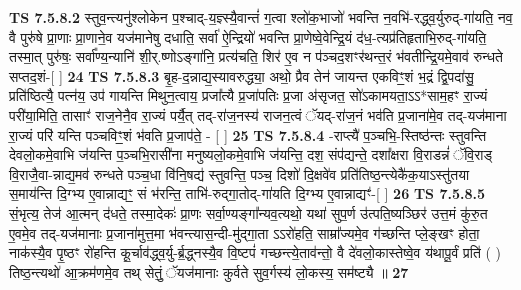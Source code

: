 \documentclass[17pt]{extarticle}
\begin{document}
                  \newline
                                \textbf{ TS 7.5.8.2} \newline
                  स्तुव॒न्त्यनु॑श्लोकेन प॒श्चाद्-य॒ज्ञ्स्यै॒वान्तं॑ ग॒त्वा श्लो॑क॒भाजो॑ भवन्ति न॒वभि॑-रद्ध्व॒र्युरुद्-गा॑यति॒ नव॒ वै पुरु॑षे प्रा॒णाः प्रा॒णाने॒व यज॑मानेषु दधाति॒ सर्वा॑ ऐ॒न्द्रियो॑ भवन्ति प्रा॒णेष्वे॒वेन्द्रि॒यं द॑ध॒-त्यप्र॑तिहृताभि॒रुद्-गा॑यति॒ तस्मा॒त् पुरु॑षः॒ सर्वा᳚ण्य॒न्यानि॑ शी॒र्.ष्णोऽङ्गा॑नि॒ प्रत्य॑चति॒ शिर॑ ए॒व न प॑ञ्चद॒शꣳर॑थन्त॒रं भ॑वतीन्द्रि॒यमे॒वाव॑ रुन्धते सप्तद॒शं-[  ] \textbf{  24} \newline
                  \newline
                                \textbf{ TS 7.5.8.3} \newline
                  बृ॒ह-द॒न्नाद्य॒स्यावरुद्ध्या॒ अथो॒ प्रैव तेन॑ जायन्त एकविꣳ॒॒शं भ॒द्रं द्वि॒पदा॑सु॒ प्रति॑ष्ठित्यै॒ पत्न॑य॒ उप॑ गायन्ति मिथुन॒त्वाय॒ प्रजा᳚त्यै प्र॒जा॑पतिः प्र॒जा अ॑सृजत॒ सो॑ऽकामयता॒ऽऽ*साम॒हꣳ रा॒ज्यं परी॑या॒मिति॒ तासाꣳ॑ राज॒नेनै॒व रा॒ज्यं पर्यै॒त् तद्-रा॑ज॒नस्य॑ राजन॒त्वं ॅयद्-रा॑ज॒नं भव॑ति प्र॒जाना॑मे॒व तद्-यज॑माना रा॒ज्यं परि॑ यन्ति पञ्चविꣳ॒॒शं भ॑वति प्र॒जाप॑ते॒ - [  ] \textbf{  25} \newline
                  \newline
                                \textbf{ TS 7.5.8.4} \newline
                  -राप्त्यै॑ प॒ञ्चभि॒-स्तिष्ठ॑न्तः स्तुवन्ति देवलो॒कमे॒वाभि ज॑यन्ति प॒ञ्चभि॒रासी॑ना मनुष्यलो॒कमे॒वाभि ज॑यन्ति॒ दश॒ संप॑द्यन्ते॒ दशा᳚क्षरा वि॒राडन्नं॑ ॅवि॒राड् वि॒राजै॒वा-न्नाद्य॒मव॑ रुन्धते पञ्च॒धा वि॑नि॒षद्य॑ स्तुवन्ति॒ पञ्च॒ दिशो॑ दि॒क्षवे॑व प्रति॑तिष्ठ॒न्त्येकै॑क॒याऽस्तु॑तया स॒माय॑न्ति दि॒ग्भ्य ए॒वान्नाद्यꣳ॒॒ सं भ॑रन्ति॒ ताभि॑-रुद्गा॒तोद्-गा॑यति दि॒ग्भ्य ए॒वान्नाद्यꣳ॑-[  ] \textbf{  26} \newline
                  \newline
                                \textbf{ TS 7.5.8.5} \newline
                  सं॒भृत्य॒ तेज॑ आ॒त्मन् द॑धते॒ तस्मा॒देकः॑ प्रा॒णः सर्वा॒ण्यङ्गा᳚न्यव॒त्यथो॒ यथा॑ सुप॒र्ण उ॑त्पति॒ष्यञ्छिर॑ उत्त॒मं कु॑रु॒त ए॒वमे॒व तद्-यज॑मानाः प्र॒जाना॑मुत्त॒मा भ॑वन्त्यास॒न्दी-मु॑द्गा॒ता ऽऽरो॑हति॒ साम्रा᳚ज्यमे॒व ग॑च्छन्ति प्ले॒ङ्खꣳ होता॒ नाक॑स्यै॒व पृ॒ष्ठꣳ रो॑हन्ति कू॒र्चाव॑द्ध्व॒र्यु-र्ब्र॒द्ध्नस्यै॒व वि॒ष्टपं॑ गच्छन्त्ये॒ताव॑न्तो॒ वै दे॑वलो॒कास्तेष्वे॒व य॑थापू॒र्वं प्रति॑ ( ) तिष्ठ॒न्त्यथो॑ आ॒क्रम॑णमे॒व तथ् सेतुं॒ ॅयज॑मानाः कुर्वते सुव॒र्गस्य॑ लो॒कस्य॒ सम॑ष्ट्यै ॥ \textbf{  27} \newline
\end{document}
